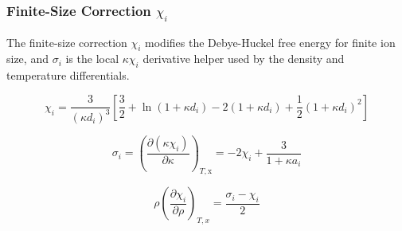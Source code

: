 \documentclass[12pt, letterpaper]{article}
\begin{document}
\subsubsection{Finite-Size Correction \(\chi_i\)}

The finite-size correction \(\chi_i\) modifies the Debye-Huckel free energy for finite ion size, and \(\sigma_i\) is the local \(\kappa\chi_i\) derivative helper used by the density and temperature differentials.

\begin{equation}
    \chi_{i}=\frac{3}{\left(\kappa d_{i}\right)^3}\left[\frac{3}{2}+\ln(1+\kappa d_{i})-2(1+\kappa d_{i})+\frac{1}{2}\left(1+\kappa d_{i}\right)^2\right]
    \label{eq:chi_dh}
\end{equation}


\begin{equation}
    \sigma_{i}=\left(\frac{\partial(\kappa\chi_{i})}{\partial\kappa}\right)_{T,\mathrm{x}}=-2\chi_{i}+\frac{3}{1+\kappa a_{i}}
    \label{eq:sigma_dh}
\end{equation}


\begin{equation}
    \rho\left(\frac{\partial \chi_i}{\partial \rho}\right)_{T,x}
    =
    \frac{\sigma_i-\chi_i}{2}
    \label{eq:dchi_dh_drho}
\end{equation}

\end{document}
